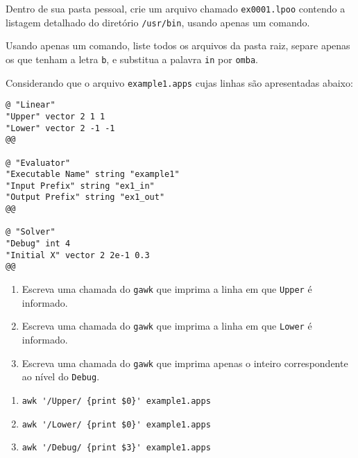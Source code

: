\begin{Exercise}[label={0001}, difficulty={1}, origin={bash}]
  Dentro de sua pasta pessoal, crie um arquivo chamado \verb+ex0001.lpoo+
  contendo a listagem detalhado do diretório \verb+/usr/bin+, usando apenas um
  comando. 
\end{Exercise}
\begin{Exercise}[label={0002}, difficulty={2}, origin={bash}]
  Usando apenas um comando, liste todos os arquivos da pasta raiz, separe apenas
  os que tenham a letra \verb+b+, e substitua a palavra \verb+in+ por
  \verb+omba+.
\end{Exercise}
\begin{Exercise}[label={0003}, difficulty={1}, origin={gawk}]
  Considerando que o arquivo \lstinline+example1.apps+ cujas linhas são
  apresentadas abaixo:
  \begin{lstlisting}
@ "Linear"
"Upper" vector 2 1 1
"Lower" vector 2 -1 -1
@@

@ "Evaluator"
"Executable Name" string "example1"
"Input Prefix" string "ex1_in"
"Output Prefix" string "ex1_out"
@@

@ "Solver" 
"Debug" int 4
"Initial X" vector 2 2e-1 0.3
@@
  \end{lstlisting}
  \begin{enumerate}
    \item Escreva uma chamada do \lstinline+gawk+ que imprima a linha em que
      \lstinline+Upper+ é informado.
    \item Escreva uma chamada do \lstinline+gawk+ que imprima a linha em que
      \lstinline+Lower+ é informado.
    \item Escreva uma chamada do \lstinline+gawk+ que imprima apenas o inteiro
      correspondente ao nível do \lstinline+Debug+.
  \end{enumerate}
\end{Exercise}
\begin{Answer}[ref={0003}]
  \begin{enumerate}
    \item \lstinline+awk '/Upper/ {print $0}' example1.apps+
    \item \lstinline+awk '/Lower/ {print $0}' example1.apps+
    \item \lstinline+awk '/Debug/ {print $3}' example1.apps+
  \end{enumerate}
\end{Answer}
